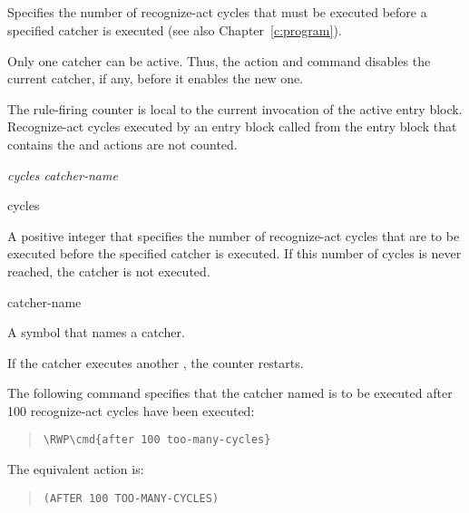 \subsection{}

Specifies the number of recognize-act cycles that must be executed
before a specified catcher is executed (see also
Chapter~\ref{c:program}).

Only one catcher can be active. Thus, the  action and
command disables the current catcher, if any, before it enables the
new one.

The rule-firing counter is local to the current invocation of the
active entry block. Recognize-act cycles executed by an entry block
called from the entry block that contains the  and
 actions are not counted.

\Format

 \it{cycles} \it{catcher-name}

\begin{arguments}
\item[cycles]

  A positive integer that specifies the number of recognize-act cycles
  that are to be executed before the specified catcher is executed. If
  this number of cycles is never reached, the catcher is not executed.

\item[catcher-name]

  A symbol that names a catcher.

  If the catcher executes another , the counter restarts.
\end{arguments}

\Example

The following command specifies that the catcher named
 is to be executed after 100 recognize-act
cycles have been executed:

\begin{quote}
\begin{Verbatim}[commandchars=\\\{\}]
\RWP\cmd{after 100 too-many-cycles}
\end{Verbatim}
\end{quote}

The equivalent action is:

\begin{quote}
\begin{verbatim}
(AFTER 100 TOO-MANY-CYCLES)
\end{verbatim}
\end{quote}

